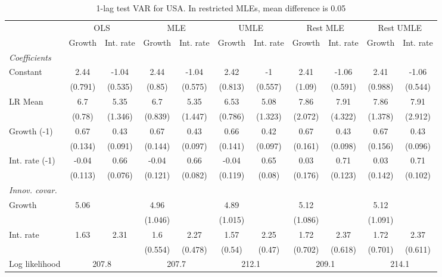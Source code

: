 \begin{table}[htbp] 
	\centering
	\begin{tabular}{@{\extracolsep{4pt}}lcccccccccc@{}}		\hline\hline
		 		 & \multicolumn{2}{c}{OLS} &\multicolumn{2}{c}{MLE} &\multicolumn{2}{c}{UMLE} &\multicolumn{2}{c}{Rest MLE} &\multicolumn{2}{c}{Rest UMLE} \\ 
 		 & Growth 	 & Int. rate 	 & Growth 	 & Int. rate 	 & Growth 	 & Int. rate 	 & Growth 	 & Int. rate 	 & Growth 	 & Int. rate\\\cline{2-3}\cline{4-5}\cline{6-7}\cline{8-9}\cline{10-11}
\rule{0pt}{4ex} 
 \emph{Coefficients} 	  		 & 		 & 		 & 		 & 		 & 		 & 		 & 		 & 		 & 		 &\\ 
\quad Constant 	 & 2.44 	 & -1.04 	 & 2.44 	 & -1.04 	 & 2.42 	 & -1 	 & 2.41 	 & -1.06 	 & 2.41 	 & -1.06	 \\ 
 		 & (0.791) 	 & (0.535) 	 & (0.85) 	 & (0.575) 	 & (0.813) 	 & (0.557) 	 & (1.09) 	 & (0.591) 	 & (0.988) 	 & (0.544) 	 \\ 
\quad LR Mean 	 & 6.7 	 & 5.35 	 & 6.7 	 & 5.35 	 & 6.53 	 & 5.08 	 & 7.86 	 & 7.91 	 & 7.86 	 & 7.91	 \\ 
 		 & (0.78) 	 & (1.346) 	 & (0.839) 	 & (1.447) 	 & (0.786) 	 & (1.323) 	 & (2.072) 	 & (4.322) 	 & (1.378) 	 & (2.912) 	 \\ 
\quad Growth (-1) 	 &0.67 	 & 0.43 	 & 0.67 	 & 0.43 	 & 0.66 	 & 0.42 	 & 0.67 	 & 0.43 	 & 0.67 	 & 0.43	 \\ 
 		 & (0.134) 	 & (0.091) 	 & (0.144) 	 & (0.097) 	 & (0.141) 	 & (0.097) 	 & (0.161) 	 & (0.098) 	 & (0.156) 	 & (0.096) 	 \\ 
\quad Int. rate (-1) 	 &-0.04 	 & 0.66 	 & -0.04 	 & 0.66 	 & -0.04 	 & 0.65 	 & 0.03 	 & 0.71 	 & 0.03 	 & 0.71	 \\ 
 		 & (0.113) 	 & (0.076) 	 & (0.121) 	 & (0.082) 	 & (0.119) 	 & (0.08) 	 & (0.176) 	 & (0.123) 	 & (0.142) 	 & (0.102) 	 \\ 
\rule{0pt}{4ex} \emph{Innov. covar.}  	 & 	 & 	 & 	 & 	 & 	 & 	 & 	 & 	 & 	 &\\ 
\quad Growth 	 &5.06 	 &  	 & 4.96 	 &  	 & 4.89 	 &  	 & 5.12 	 &  	 & 5.12 	 & 	 \\ 
 		 &  	 &  	 & (1.046) 	 &  	 & (1.015) 	 &  	 & (1.086) 	 &  	 & (1.091) 	 &  	 \\ 
\quad Int. rate 	 &1.63 	 & 2.31 	 & 1.6 	 & 2.27 	 & 1.57 	 & 2.25 	 & 1.72 	 & 2.37 	 & 1.72 	 & 2.37	 \\ 
 		 &  	 &  	 & (0.554) 	 & (0.478) 	 & (0.54) 	 & (0.47) 	 & (0.702) 	 & (0.618) 	 & (0.701) 	 & (0.611) 	 \\ 
 \hline \rule{0pt}{4ex} 
  Log likelihood 	 &\multicolumn{2}{c}{207.8} 	 & \multicolumn{2}{c}{207.7} 	 & \multicolumn{2}{c}{212.1} 	 & \multicolumn{2}{c}{209.1} 	 & \multicolumn{2}{c}{214.1}\\ 

 \hline 	\end{tabular}		\caption{1-lag test VAR for USA. In restricted MLEs, mean difference is 0.05}
		\label{tab:USA1lag}

\end{table}